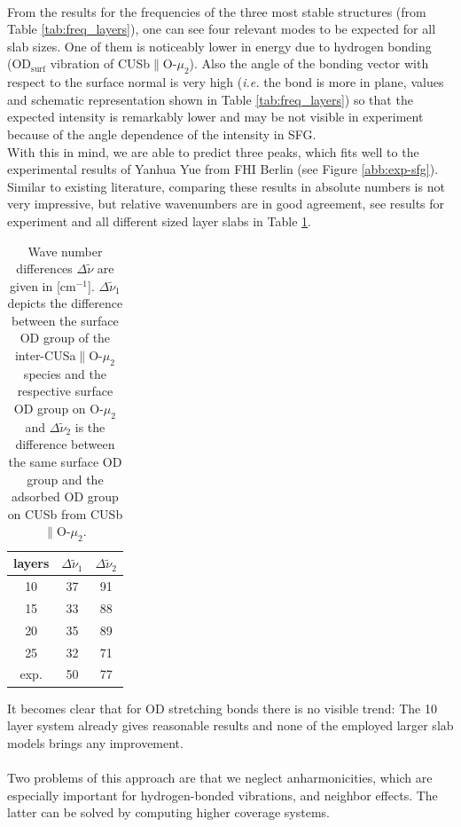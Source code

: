\documentclass[11pt,DIV=13,BCOR=5mm,a4paper,headinclude]{scrbook}
\begin{document}
\\
From the results for the frequencies of the three most stable structures (from Table \ref{tab:freq_layers}), one can see four relevant modes to be expected for all slab sizes.
One of them is noticeably lower in energy due to hydrogen bonding (OD$_\textrm{surf}$ vibration of CUSb$\parallel$O-$\mu_2$).
Also the angle of the bonding vector with respect to the surface normal is very high (\textit{i.e.} the bond is more in plane, values and schematic representation shown in Table \ref{tab:freq_layers}) so that the expected intensity is remarkably lower and may be not visible in experiment because of the angle dependence of the intensity in SFG.
\\
With this in mind, we are able to predict three peaks, which fits well to the experimental results of Yanhua Yue from FHI Berlin (see Figure \ref{abb:exp-sfg}).
Similar to existing literature\cite{Wirth2014}, comparing these results in absolute numbers is not very impressive, but relative wavenumbers are in good agreement, see results for experiment and all different sized layer slabs in Table \ref{tab:rel_modes}.
\begin{table}[!h]
\begin{center}
\caption{Wave number differences $\Delta \tilde{\nu}$ are given in [cm$^{-1}$].
$\Delta \tilde{\nu}_1$ depicts the difference between the surface OD group of the inter-CUSa$\parallel$O-$\mu_2$ species and the respective surface OD group on O-$\mu_2$ and  $\Delta \tilde{\nu}_2$ is the difference between the same surface OD group and the adsorbed OD group on CUSb from CUSb$\parallel$O-$\mu_2$.}
\begin{tabular}{ccc}
\toprule
layers & $\Delta \tilde{\nu}_1$ &  $\Delta \tilde{\nu}_2$\\\midrule
10  &37 &91 \\
15  &33 &88 \\
20  &35 &89 \\
25  &32 &71 \\\midrule
exp.&50 &77 \\\bottomrule
  \end{tabular}
\label{tab:rel_modes}
\end{center}
\end{table}
It becomes clear that for OD stretching bonds there is no visible trend: The 10 layer system already gives reasonable results and none of the employed larger slab models brings any improvement.
\\
\\
Two problems of this approach are that we neglect anharmonicities, which are especially important for hydrogen-bonded vibrations, and neighbor effects.
The latter can be solved by computing higher coverage systems.
\\
\end{document}

